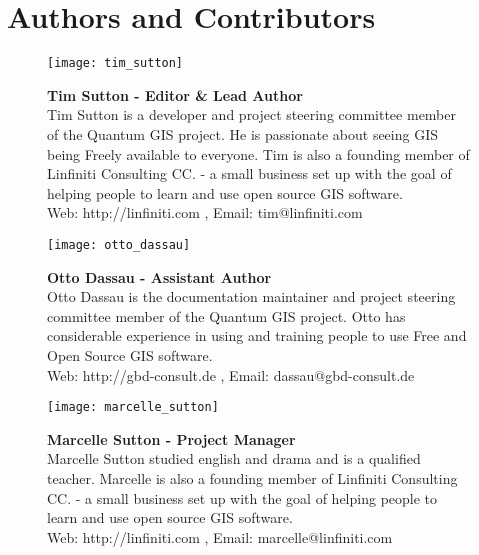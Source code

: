 
\thispagestyle{empty}


\section*{Authors and Contributors}


\begin{figure}[ht]
\begin{center}
\begin{minipage}[h]{5cm}\texttt{[image: tim\_sutton]}
\end{minipage}
\begin{minipage}[h]{11.5cm} 
\textbf{Tim Sutton - Editor \& Lead Author} \\
Tim Sutton is a developer and project steering committee member of the
Quantum GIS project. He is passionate about seeing GIS being Freely available
to everyone. Tim is also a founding member of Linfiniti Consulting CC. - a
small business set up with the goal of helping people to learn and use open
source GIS software. \\
Web: http://linfiniti.com , Email: tim@linfiniti.com
\end{minipage}

\vspace{0.1cm}

\begin{minipage}[h]{5cm}\texttt{[image: otto\_dassau]}
\end{minipage}
\begin{minipage}[h]{11.5cm}
\textbf{Otto Dassau - Assistant Author} \\
Otto Dassau is the documentation maintainer and project steering committee
member of the Quantum GIS project. Otto has considerable experience in using
and training people to use Free and Open Source GIS software. \\
Web: http://gbd-consult.de , Email: dassau@gbd-consult.de
\end{minipage}

\vspace{0.1cm}

\begin{minipage}[h]{5cm}\texttt{[image: marcelle\_sutton]}
\end{minipage}
\begin{minipage}[h]{11.5cm}
\textbf{Marcelle Sutton - Project Manager} \\
Marcelle Sutton studied english and drama and is a qualified teacher.
Marcelle is also a founding member of Linfiniti Consulting CC. - a
small business set up with the goal of helping people to learn and use open
source GIS software. \\
Web: http://linfiniti.com , Email: marcelle@linfiniti.com
\end{minipage}


\end{center}
\end{figure}
